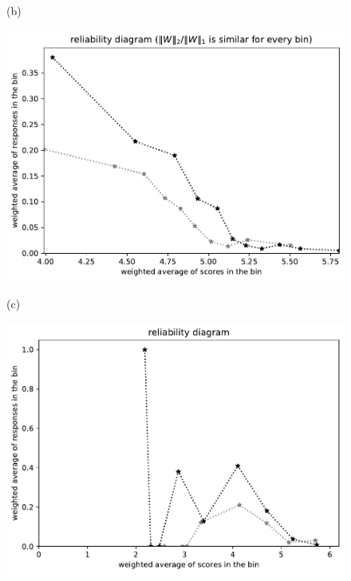 \documentclass{article}
\newlength{\vertsep}
\newlength{\imsize}
\begin{document}
\begin{figure}
\begin{centering}
(b)
\parbox{\imsize}{\includegraphics[width=\imsize]
{../codes/weighted/County_of_San_Francisco_vs_San_Joaquin-LNGI/equierrs10.pdf}}
\quad\quad
(c)
\parbox{\imsize}{\includegraphics[width=\imsize]
{../codes/weighted/County_of_San_Francisco_vs_San_Joaquin-LNGI/equiscores10.pdf}}

\vspace{\vertsep}


\end{centering}
\end{figure}
\end{document}
